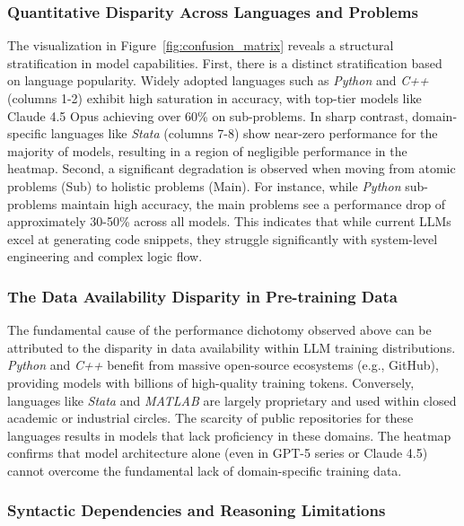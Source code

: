 \documentclass{article}
\theoremstyle{plain}
\theoremstyle{definition}
\theoremstyle{remark}
\begin{document}
\subsubsection{Quantitative Disparity Across Languages and Problems}
\label{subsubsec:quantitative_disparity}

The visualization in Figure~\ref{fig:confusion_matrix} reveals a structural stratification in model capabilities. 
First, there is a distinct stratification based on language popularity. Widely adopted languages such as \textit{Python} and \textit{C++} (columns 1-2) exhibit high saturation in accuracy, with top-tier models like Claude 4.5 Opus achieving over 60\% on sub-problems. In sharp contrast, domain-specific languages like \textit{Stata} (columns 7-8) show near-zero performance for the majority of models, resulting in a region of negligible performance in the heatmap.
Second, a significant degradation is observed when moving from atomic problems (Sub) to holistic problems (Main). For instance, while \textit{Python} sub-problems maintain high accuracy, the main problems see a performance drop of approximately 30-50\% across all models. This indicates that while current LLMs excel at generating code snippets, they struggle significantly with system-level engineering and complex logic flow.

\subsubsection{The Data Availability Disparity in Pre-training Data}
\label{subsubsec:data_disparity}

The fundamental cause of the performance dichotomy observed above can be attributed to the disparity in data availability within LLM training distributions. \textit{Python} and \textit{C++} benefit from massive open-source ecosystems (e.g., GitHub), providing models with billions of high-quality training tokens. Conversely, languages like \textit{Stata} and \textit{MATLAB} are largely proprietary and used within closed academic or industrial circles. The scarcity of public repositories for these languages results in models that lack proficiency in these domains. The heatmap confirms that model architecture alone (even in GPT-5 series or Claude 4.5) cannot overcome the fundamental lack of domain-specific training data.

\subsubsection{Syntactic Dependencies and Reasoning Limitations}
\label{subsubsec:reasoning_limitations}
\end{document}
